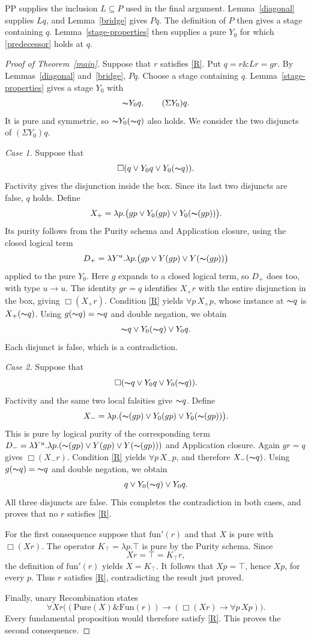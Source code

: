 \documentclass[12pt,leqno]{article}
\newcommand{\AND}{\ensuremath{\mathbin{\&}}}
\newcommand{\OR}{\ensuremath{\vee}}
\newcommand{\IC}{\ensuremath{\rightarrow}}
\newcommand{\NOT}{\ensuremath{\text{$\thicksim$}}}
\newcommand{\Pure}{\mathrm{Pure}}
\newcommand{\Fun}{\mathrm{Fun}}
\newcommand{\funp}{\mathrm{fun}'}
\newcommand{\Ktop}{K_{\top}}
\begin{document}
PP supplies the inclusion $L\subseteq P$ used in the final argument.
Lemma~\ref{diagonal} supplies $Lq$, and Lemma~\ref{bridge} gives $Pq$.
The definition of $P$ then gives a stage containing $q$. Lemma~\ref{stage-properties}
then supplies a pure $Y_0$ for which \eqref{predecessor} holds at $q$.

\begin{proof}[Proof of Theorem~\ref{main}]
Suppose that $r$ satisfies \eqref{R}. Put $q=r\AND Lr=gr$.
By Lemmas~\ref{diagonal} and~\ref{bridge}, $Pq$.
Choose a stage containing $q$. Lemma~\ref{stage-properties} gives
a stage $Y_0$ with
\[
 \NOT Y_0q,\qquad(\Sigma Y_0)q.
\]
It is pure and symmetric, so $\NOT Y_0(\NOT q)$ also holds.
We consider the two disjuncts of $(\Sigma Y_0)q$.

\emph{Case 1.} Suppose that
\[
 \Box(q\OR Y_0q\OR Y_0(\NOT q)).
\]
Factivity gives the disjunction inside the box. Since its last two
disjuncts are false, $q$ holds. Define
\[
 X_+=\lambda p.\bigl(gp\OR Y_0(gp)\OR Y_0(\NOT(gp))\bigr).
\]
Its purity follows from the Purity schema and Application closure,
using the closed logical term
\[
 D_+=\lambda Y^u.\lambda p.
       \bigl(gp\OR Y(gp)\OR Y(\NOT(gp))\bigr)
\]
applied to the pure $Y_0$. Here $g$ expands to a closed logical term,
so $D_+$ does too, with type $u\to u$.
The identity $gr=q$ identifies $X_+r$ with the entire disjunction
in the box, giving $\Box(X_+r)$.
Condition \eqref{R} yields $\forall p\,X_+p$, whose instance at
$\NOT q$ is $X_+(\NOT q)$.
Using $g(\NOT q)=\NOT q$ and double negation, we obtain
\[
 \NOT q\OR Y_0(\NOT q)\OR Y_0q.
\]
Each disjunct is false, which is a contradiction.

\emph{Case 2.} Suppose that
\[
 \Box(\NOT q\OR Y_0q\OR Y_0(\NOT q)).
\]
Factivity and the same two local falsities give $\NOT q$. Define
\[
 X_-=\lambda p.\bigl(\NOT(gp)\OR Y_0(gp)\OR Y_0(\NOT(gp))\bigr).
\]
This is pure by logical purity of the corresponding term
$D_-=\lambda Y^u.\lambda p.
 (\NOT(gp)\OR Y(gp)\OR Y(\NOT(gp)))$ and Application closure.
Again $gr=q$ gives $\Box(X_-r)$. Condition \eqref{R} yields
$\forall p\,X_-p$, and therefore $X_-(\NOT q)$.
Using $g(\NOT q)=\NOT q$ and double negation, we obtain
\[
 q\OR Y_0(\NOT q)\OR Y_0q.
\]
All three disjuncts are false. This completes the contradiction
in both cases, and proves that no $r$ satisfies \eqref{R}.

For the first consequence suppose that $\funp(r)$ and that $X$ is
pure with $\Box(Xr)$. The operator $\Ktop=\lambda p.\top$ is pure
by the Purity schema. Since
\[
 Xr=\top=\Ktop r,
\]
the definition of $\funp(r)$ yields $X=\Ktop$. It follows that
$Xp=\top$, hence $Xp$, for every $p$. Thus $r$ satisfies
\eqref{R}, contradicting the result just proved.

Finally, unary Recombination states
\[
 \forall Xr\bigl((\Pure(X)\AND\Fun(r))
              \IC(\Box(Xr)\IC\forall p\,Xp)\bigr).
\]
Every fundamental proposition would therefore satisfy \eqref{R}.
This proves the second consequence.
\end{proof}
\end{document}
